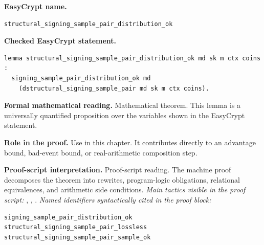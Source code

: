 \begin{formaltheorem}
\noindent\textbf{EasyCrypt name.}
\begin{lstlisting}[language=EasyCrypt,basicstyle=\ttfamily\scriptsize]
structural_signing_sample_pair_distribution_ok
\end{lstlisting}
\noindent\textbf{Checked EasyCrypt statement.}
\begin{lstlisting}[language=EasyCrypt,basicstyle=\ttfamily\scriptsize]
lemma structural_signing_sample_pair_distribution_ok md sk m ctx coins :
  signing_sample_pair_distribution_ok md
    (dstructural_signing_sample_pair md sk m ctx coins).
\end{lstlisting}
\noindent\textbf{Formal mathematical reading.}
Mathematical theorem. This lemma is a universally quantified proposition over the variables shown in the EasyCrypt statement.

\noindent\textbf{Role in the proof.}
Use in this chapter. It contributes directly to an advantage bound, bad-event bound, or real-arithmetic composition step.

\noindent\textbf{Proof-script interpretation.}
Proof-script reading. The machine proof decomposes the theorem into rewrites, program-logic obligations, relational equivalences, and arithmetic side conditions.
\emph{Main tactics visible in the proof script:} , , .
\emph{Named identifiers syntactically cited in the proof block:}
\begin{lstlisting}[language=EasyCrypt,basicstyle=\ttfamily\scriptsize]
signing_sample_pair_distribution_ok
structural_signing_sample_pair_lossless
structural_signing_sample_pair_sample_ok
\end{lstlisting}

\end{formaltheorem}

